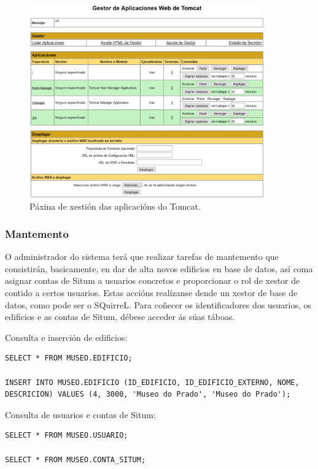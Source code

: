 \begin{figure}[h]
	\begin{center}
		\includegraphics[width=0.9\textwidth]{figures/capturas/tomcatXestor}
		\caption{Páxina de xestión das aplicacións do Tomcat.}
		\label{fig:tomcatXestor}
	\end{center}
\end{figure}


\subsubsection{Mantemento}
O administrador do sistema terá que realizar tarefas de mantemento que consistirán, basicamente, en dar de alta novos edificios en base de datos, así coma asignar contas de Situm a usuarios concretos e proporcionar o rol de xestor de contido a certos usuarios. Estas accións realízanse dende un xestor de base de datos, como pode ser o SQuirreL. Para coñecer os identificadores dos usuarios, os edificios e as contas de Situm, débese acceder ás súas táboas.

Consulta e inserción de edificios:
\begin{lstlisting}
SELECT * FROM MUSEO.EDIFICIO;

INSERT INTO MUSEO.EDIFICIO (ID_EDIFICIO, ID_EDIFICIO_EXTERNO, NOME, DESCRICION) VALUES (4, 3000, 'Museo do Prado', 'Museo do Prado');
\end{lstlisting}

Consulta de usuarios e contas de Situm:
\begin{lstlisting}
SELECT * FROM MUSEO.USUARIO;

SELECT * FROM MUSEO.CONTA_SITUM;
\end{lstlisting}

